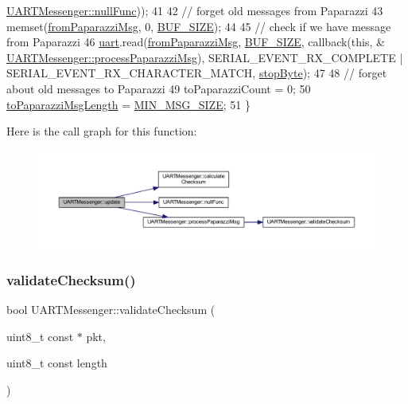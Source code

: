 \begin{DoxyCode}
      \hyperlink{class_u_a_r_t_messenger_a91aa0a571db31d7a0a7f2535a97c30c3}{UARTMessenger::nullFunc}));
41 
42     \textcolor{comment}{// forget old messages from Paparazzi}
43     memset(\hyperlink{class_u_a_r_t_messenger_a0cdc15059654a4231fcfe312612c73f3}{fromPaparazziMsg}, 0, \hyperlink{_u_a_r_t_messenger_8h_a6821bafc3c88dfb2e433a095df9940c6}{BUF\_SIZE});
44 
45     \textcolor{comment}{// check if we have message from Paparazzi}
46     \hyperlink{class_u_a_r_t_messenger_aabc5283b509be4ce8335bbb2513e9b4c}{uart}.read(\hyperlink{class_u_a_r_t_messenger_a0cdc15059654a4231fcfe312612c73f3}{fromPaparazziMsg}, \hyperlink{_u_a_r_t_messenger_8h_a6821bafc3c88dfb2e433a095df9940c6}{BUF\_SIZE}, callback(\textcolor{keyword}{this}, &
      \hyperlink{class_u_a_r_t_messenger_a3ae1cd91810b34f89244cd157c436c3c}{UARTMessenger::processPaparazziMsg}), SERIAL\_EVENT\_RX\_COMPLETE | 
      SERIAL\_EVENT\_RX\_CHARACTER\_MATCH, \hyperlink{class_u_a_r_t_messenger_abd1f0ee480db317c51ea633fff5dd9af}{stopByte});
47 
48     \textcolor{comment}{// forget about old messages to Paparazzi}
49     toPaparazziCount = 0;
50     \hyperlink{class_u_a_r_t_messenger_ae2a77be89a1f84b466eab4753929b902}{toPaparazziMsgLength} = \hyperlink{_u_a_r_t_messenger_8h_a03caf75f3be11c473c11ea925cef73e2}{MIN\_MSG\_SIZE};
51 \}
\end{DoxyCode}
Here is the call graph for this function\+:\nopagebreak
\begin{figure}[H]
\begin{center}
\leavevmode
\includegraphics[width=350pt]{class_u_a_r_t_messenger_a7f2c3bdcf3a2b082e52815b97be37281_cgraph}
\end{center}
\end{figure}
\mbox{\label{class_u_a_r_t_messenger_a8e90d75bc44daee10b5d6cf70e1c1fb4}} 
\subsubsection{\texorpdfstring{validate\+Checksum()}{validateChecksum()}}
{\footnotesize\ttfamily bool U\+A\+R\+T\+Messenger\+::validate\+Checksum (\begin{DoxyParamCaption}\item[{uint8\+\_\+t const $\ast$}]{pkt,  }\item[{uint8\+\_\+t const}]{length }\end{DoxyParamCaption})\hspace{0.3cm}{\ttfamily [private]}}



